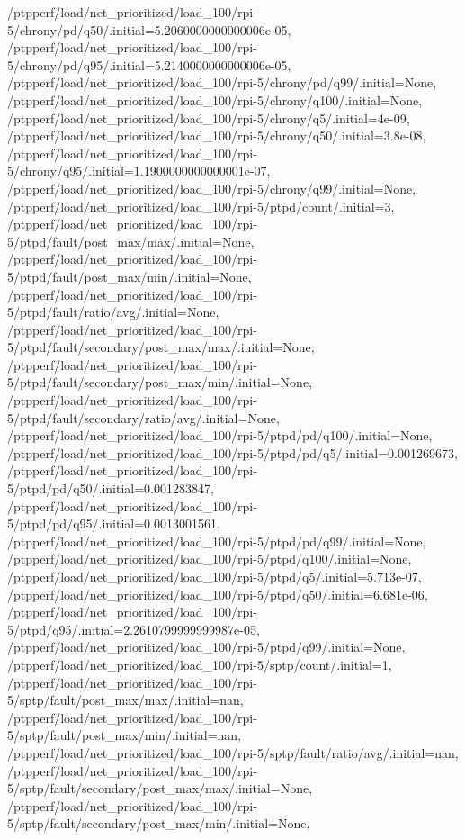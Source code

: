 {    /ptpperf/load/net_prioritized/load_100/rpi-5/chrony/pd/q50/.initial=5.2060000000000006e-05,
    /ptpperf/load/net_prioritized/load_100/rpi-5/chrony/pd/q95/.initial=5.2140000000000006e-05,
    /ptpperf/load/net_prioritized/load_100/rpi-5/chrony/pd/q99/.initial=None,
    /ptpperf/load/net_prioritized/load_100/rpi-5/chrony/q100/.initial=None,
    /ptpperf/load/net_prioritized/load_100/rpi-5/chrony/q5/.initial=4e-09,
    /ptpperf/load/net_prioritized/load_100/rpi-5/chrony/q50/.initial=3.8e-08,
    /ptpperf/load/net_prioritized/load_100/rpi-5/chrony/q95/.initial=1.1900000000000001e-07,
    /ptpperf/load/net_prioritized/load_100/rpi-5/chrony/q99/.initial=None,
    /ptpperf/load/net_prioritized/load_100/rpi-5/ptpd/count/.initial=3,
    /ptpperf/load/net_prioritized/load_100/rpi-5/ptpd/fault/post_max/max/.initial=None,
    /ptpperf/load/net_prioritized/load_100/rpi-5/ptpd/fault/post_max/min/.initial=None,
    /ptpperf/load/net_prioritized/load_100/rpi-5/ptpd/fault/ratio/avg/.initial=None,
    /ptpperf/load/net_prioritized/load_100/rpi-5/ptpd/fault/secondary/post_max/max/.initial=None,
    /ptpperf/load/net_prioritized/load_100/rpi-5/ptpd/fault/secondary/post_max/min/.initial=None,
    /ptpperf/load/net_prioritized/load_100/rpi-5/ptpd/fault/secondary/ratio/avg/.initial=None,
    /ptpperf/load/net_prioritized/load_100/rpi-5/ptpd/pd/q100/.initial=None,
    /ptpperf/load/net_prioritized/load_100/rpi-5/ptpd/pd/q5/.initial=0.001269673,
    /ptpperf/load/net_prioritized/load_100/rpi-5/ptpd/pd/q50/.initial=0.001283847,
    /ptpperf/load/net_prioritized/load_100/rpi-5/ptpd/pd/q95/.initial=0.0013001561,
    /ptpperf/load/net_prioritized/load_100/rpi-5/ptpd/pd/q99/.initial=None,
    /ptpperf/load/net_prioritized/load_100/rpi-5/ptpd/q100/.initial=None,
    /ptpperf/load/net_prioritized/load_100/rpi-5/ptpd/q5/.initial=5.713e-07,
    /ptpperf/load/net_prioritized/load_100/rpi-5/ptpd/q50/.initial=6.681e-06,
    /ptpperf/load/net_prioritized/load_100/rpi-5/ptpd/q95/.initial=2.2610799999999987e-05,
    /ptpperf/load/net_prioritized/load_100/rpi-5/ptpd/q99/.initial=None,
    /ptpperf/load/net_prioritized/load_100/rpi-5/sptp/count/.initial=1,
    /ptpperf/load/net_prioritized/load_100/rpi-5/sptp/fault/post_max/max/.initial=nan,
    /ptpperf/load/net_prioritized/load_100/rpi-5/sptp/fault/post_max/min/.initial=nan,
    /ptpperf/load/net_prioritized/load_100/rpi-5/sptp/fault/ratio/avg/.initial=nan,
    /ptpperf/load/net_prioritized/load_100/rpi-5/sptp/fault/secondary/post_max/max/.initial=None,
    /ptpperf/load/net_prioritized/load_100/rpi-5/sptp/fault/secondary/post_max/min/.initial=None,
}
